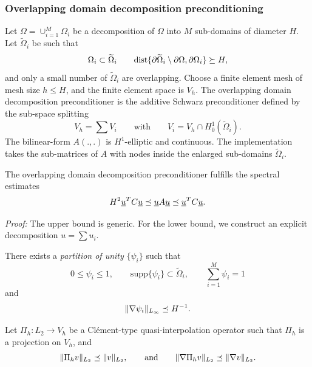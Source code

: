 \subsubsection{Overlapping domain decomposition preconditioning}

Let $\Omega = \cup_{i=1}^M \Omega_i$ be a decomposition of $\Omega$ into 
$M$ sub-domains of diameter $H$. Let $\widetilde \Omega_i$ be such that
$$
\Omega_i \subset \widetilde \Omega_i \qquad
\mbox{dist}\{ \partial \widetilde \Omega_i \setminus \partial \Omega, \partial \Omega_i\} \succeq H,
$$
and only a small number of $\widetilde \Omega_i$ are overlapping.
Choose a finite element mesh of mesh size $h \leq H$, and the finite element
space is $V_h$. The overlapping domain decomposition preconditioner is the
additive Schwarz preconditioner defined by the sub-space splitting
$$
V_h = \sum V_i \qquad \mbox{with} \qquad V_i = V_h \cap H_0^1(\widetilde \Omega_i).
$$
The bilinear-form $A(.,.)$ is $H^1$-elliptic and continuous.
The implementation takes the sub-matrices of $A$ with nodes inside the 
enlarged sub-domains $\widetilde \Omega_i$. 


\begin{lemma} The overlapping domain decomposition preconditioner fulfills
the spectral estimates
$$
H^2 \underline u^T C \underline u \preceq \underline u A \underline u \preceq \underline u^T C \underline u.
$$
\end{lemma}
{\em Proof:} The upper bound is generic. For the lower bound, we construct
an explicit decomposition $u = \sum u_i$.

There exists a {\em partition of unity} $\{ \psi_i \}$ such that
$$
0 \leq \psi_i \leq 1, \qquad \mbox{supp} \{ \psi_i \} \subset \widetilde \Omega_i, \qquad \sum_{i=1}^M \psi_i = 1
$$
and
$$
\| \nabla \psi_i \|_{L_\infty} \preceq H^{-1}.
$$

Let $\Pi_h : L_2 \rightarrow V_h$ be a Cl\'ement-type quasi-interpolation 
operator such that $\Pi_h$ is a projection on $V_h$, and 
$$
\| \Pi_h v \|_{L_2} \preceq \| v \|_{L_2}, \qquad \mbox{and} \qquad
\| \nabla \Pi_h v \|_{L_2} \preceq \| \nabla v \|_{L_2}.
$$

